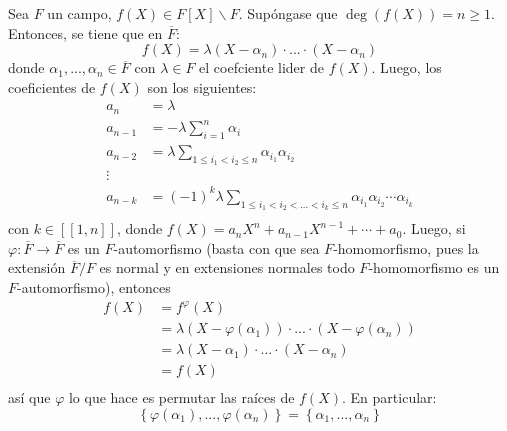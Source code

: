 \documentclass[12pt]{report}
\theoremstyle{largebreak}
\newcommand\cf[3]{\ensuremath{#1:#2\rightarrow#3}}
\newcommand\natint[1]{\ensuremath{\left[\!\left[ #1\right]\!\right]}}
\begin{document}
    \begin{obs}
        Sea $F$ un campo, $f(X)\in F[X]\backslash F$. Supóngase que $\deg(f(X))=n\geq1$. Entonces, se tiene que en $\overline{F}$:
        \begin{equation*}
            f(X)=\lambda(X-\alpha_n)\cdot...\cdot(X-\alpha_n)
        \end{equation*}
        donde $\alpha_1,...,\alpha_n\in\overline{F}$ con $\lambda\in F$ el coefciente lider de $f(X)$. Luego, los coeficientes de $f(X)$ son los siguientes:
        \begin{equation*}
            \begin{split}
                a_n&=\lambda\\
                a_{ n-1}&=-\lambda\sum_{ i=1}^{n}\alpha_i\\
                a_{ n-2}&=\lambda\sum_{1\leq i_1<i_2\leq n}\alpha_{ i_1}\alpha_{ i_2}\\
                 \vdots &\\
                a_{ n-k}&=(-1)^k\lambda\sum_{1\leq i_1<i_2<\dots<i_k\leq n }\alpha_{ i_1}\alpha_{ i_2}\cdots \alpha_{i_k}\\
            \end{split}
        \end{equation*}
        con $k\in\natint{1,n}$, donde $f(X)=a_nX^n+a_{ n-1}X^{ n-1}+\cdots+a_0$. Luego, si $\cf{\varphi}{\overline{F}}{\overline{F}}$ es un $F$-automorfismo (basta con que sea $F$-homomorfismo, pues la extensión $\overline{F}/F$ es normal y en extensiones normales todo $F$-homomorfismo es un $F$-automorfismo), entonces
        \begin{equation*}
            \begin{split}
                f(X)&=f^{\varphi}(X)\\
                &=\lambda(X-\varphi(\alpha_1))\cdot...\cdot(X-\varphi(\alpha_n))\\
                &=\lambda(X-\alpha_1)\cdot...\cdot(X-\alpha_n)\\
                &=f(X)\\
            \end{split}
        \end{equation*}
        así que $\varphi$ lo que hace es permutar las raíces de $f(X)$. En particular:
        \begin{equation*}
            \left\{\varphi(\alpha_1),...,\varphi(\alpha_n) \right\}=\left\{\alpha_1,...,\alpha_n\right\}
        \end{equation*}
    \end{obs}
\end{document}
